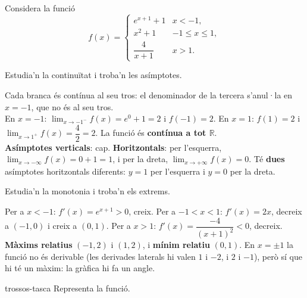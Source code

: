 Considera la funció
\[
f(x)=\begin{cases}
  e^{x+1}+1 & \si{x<-1},\\[4pt]
  x^2+1 & \si{-1\le x\le 1},\\[4pt]
  \dfrac{4}{x+1} & \si{x>1}.
\end{cases}
\]

\begin{apartats}

Estudia'n la continuïtat i troba'n les asímptotes.

\begin{solucio}
Cada branca és contínua al seu tros: el denominador de la tercera s'anul·la en $x=-1$, que no és al
seu tros.\\
En $x=-1$: $\lim_{x\to-1^-}f(x)=e^0+1=2$ i $f(-1)=2$. En $x=1$: $f(1)=2$ i
$\lim_{x\to1^+}f(x)=\dfrac42=2$. La funció és \textbf{contínua a tot $\mathbb{R}$}.\\
\textbf{Asímptotes verticals}: cap. \textbf{Horitzontals}: per l'esquerra,
$\lim_{x\to-\infty}f(x)=0+1=1$, i per la dreta, $\lim_{x\to+\infty}f(x)=0$. Té \textbf{dues}
asímptotes horitzontals diferents: $y=1$ per l'esquerra i $y=0$ per la dreta.
\end{solucio}

\begin{nomesllarg}
Estudia'n la monotonia i troba'n els extrems.

\begin{solucio}
Per a $x<-1$: $f'(x)=e^{x+1}>0$, creix. Per a $-1<x<1$: $f'(x)=2x$, decreix a $(-1,0)$ i creix a
$(0,1)$. Per a $x>1$: $f'(x)=\dfrac{-4}{(x+1)^2}<0$, decreix.\\
\textbf{Màxims relatius} $(-1,2)$ i $(1,2)$, i \textbf{mínim relatiu} $(0,1)$. En $x=\pm1$ la funció
no és derivable (les derivades laterals hi valen $1$ i $-2$, i $2$ i $-1$), però sí que hi té un
màxim: la gràfica hi fa un angle.
\end{solucio}
\end{nomesllarg}

\begin{tria}{trossos-tasca}
Representa la funció.


\end{tria}
\end{apartats}
